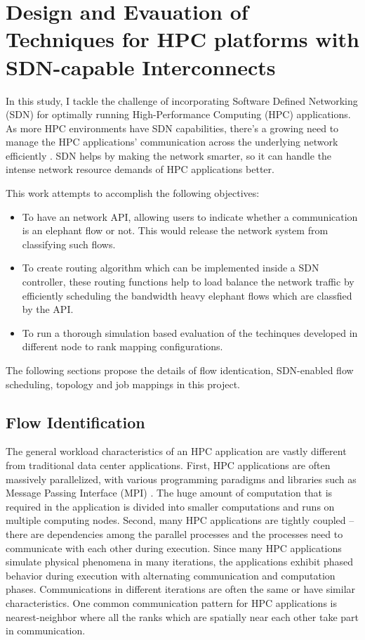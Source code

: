 \chapter{Design and Evauation of Techniques for HPC platforms with SDN-capable Interconnects} In
this study, I tackle the challenge of incorporating Software Defined
Networking (SDN) for optimally running High-Performance Computing (HPC)
applications. As more HPC environments have SDN capabilities, there's a growing
need to manage the HPC applications' communication across the underlying network
efficiently \cite{kreutz2014software, alalmaei2020sdn, he2016firebird,}. 
SDN helps by making the network smarter, so it can handle
the intense network resource demands of HPC applications better. 

This work attempts to accomplish the following objectives:
\begin{itemize}
\item To have an network API,
allowing users to indicate whether a communication is an elephant flow or not. This
would release the network system from classifying such flows.

\item To create routing algorithm which can be implemented inside a
SDN controller, these routing functions help to load balance the network traffic
by efficiently scheduling the bandwidth heavy elephant flows which are classfied by the API.


\item To run a thorough simulation based evaluation of the techinques developed
in different node to rank mapping configurations.
\end{itemize}

The following sections propose the details of flow identication, SDN-enabled flow scheduling, topology and job mappings in this project.

\section{Flow Identification}
The general
workload characteristics of an HPC application are vastly different from
traditional data center applications. First, HPC applications are often
massively parallelized, with various programming paradigms and libraries such as
Message Passing Interface (MPI) \cite{forum1994mpi}. The huge amount of computation that is
required in the application is divided into smaller computations and runs on
multiple computing nodes. Second, many HPC applications are tightly coupled –
there are dependencies among the parallel processes and the processes need to
communicate with each other during execution. Since many HPC applications
simulate physical phenomena in many iterations, the applications exhibit phased
behavior during execution with alternating communication and computation phases.
Communications in different iterations are often the same or have similar
characteristics. One common communication pattern for HPC applications is
nearest-neighbor where all the ranks which are spatially near each other take
part in communication. 

